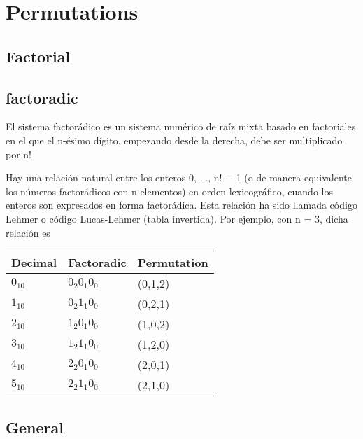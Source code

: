 \section{Permutations}
	\subsection{Factorial}
		
		\subsection{factoradic}
		El sistema factorádico es un sistema numérico de raíz mixta basado en factoriales en el que el n-ésimo dígito, empezando desde la derecha, debe ser multiplicado por n!

		Hay una relación natural entre los enteros 0, ..., n! − 1 (o de manera equivalente los números factorádicos con n elementos) en orden lexicográfico, cuando los enteros son expresados en forma factorádica. Esta relación ha sido llamada código Lehmer o código Lucas-Lehmer (tabla invertida). Por ejemplo, con n = 3, dicha relación es

		\begin{tabular}{lll}
			\hline
		\multicolumn{1}{|l|}{Decimal} & \multicolumn{1}{l|}{Factoradic} & \multicolumn{1}{l|}{Permutation} \\ \hline
		$0_{10}$                         & $0_2 0_1 0_0$                   & (0,1,2)   \\                      
		$1_{10}$                         & $0_2 1_1 0_0$                   & (0,2,1)   \\                    
		$2_{10}$                         & $1_2 0_1 0_0$                   & (1,0,2)   \\                    
		$3_{10}$                         & $1_2 1_1 0_0$                   & (1,2,0)   \\                    
		$4_{10}$                         & $2_2 0_1 0_0$                   & (2,0,1)   \\                    
		$5_{10}$                         & $2_2 1_1 0_0$                   & (2,1,0)                         
		\end{tabular}

	\subsection{General}

